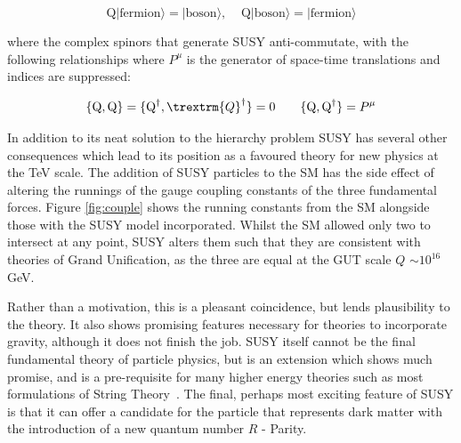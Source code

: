 \begin{equation}
\textrm{Q}|\textrm{fermion}\rangle = |\textrm{boson}\rangle,  \; \; \; \;  \textrm{Q}|\textrm{boson}\rangle = |\textrm{fermion}\rangle  
\label{eqn:Q}
\end{equation}

where the complex spinors that generate SUSY anti-commutate, with the following relationships where $P^{\mu}$ is the generator of space-time translations and indices are suppressed:


\begin{equation}
\{\textrm{Q},\textrm{Q}\} = \{\textrm{Q}^{\dagger},\trextrm{Q}^{\dagger}\} = 0 \qquad \{\textrm{Q},\textrm{Q}^{\dagger}\} = P^{\mu} 
\end{equation} 



In addition to its neat solution to the hierarchy problem SUSY has several other consequences which lead to its position as a favoured theory for new physics at the TeV scale. The addition of SUSY particles to the SM has the side effect of altering the runnings of the gauge coupling constants of the three fundamental forces. Figure \ref{fig:couple} shows the running constants from the SM alongside those with the SUSY model incorporated. Whilst the SM allowed only two to intersect at any point, SUSY alters them such that they are consistent with theories of Grand Unification, as the three are equal at the GUT scale $Q$ $\sim 10^{16}$ GeV. 

Rather than a motivation, this is a pleasant coincidence, but lends plausibility to the theory. It also shows promising features necessary for theories to incorporate gravity, although it does not finish the job. SUSY itself cannot be the final fundamental theory of particle physics, but is an extension which shows much promise, and is a pre-requisite for many higher energy theories such as most formulations of String Theory~\cite{Dine}. The final, perhaps most exciting feature of SUSY is that it can offer a candidate for the particle that represents dark matter with the introduction of a new quantum number $R$ - Parity. 

